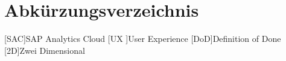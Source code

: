 \section*{Abkürzungsverzeichnis}
\begin{acronym}
    [SAC]{SAP Analytics Cloud}
    [UX ]{User Experience} 
    [DoD]{Definition of Done}
    [2D]{Zwei Dimensional}
\end{acronym}
